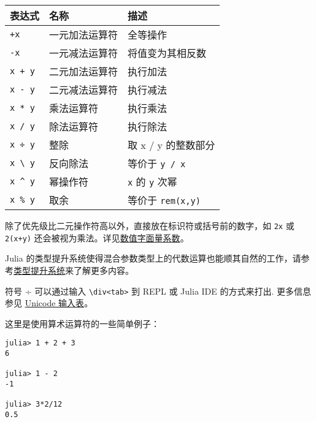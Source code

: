 \begin{table}[h]

\begin{tabulary}{\linewidth}{|L|L|L|}
\hline
表达式 & 名称 & 描述 \\
\hline
\texttt{+x} & 一元加法运算符 & 全等操作 \\
\hline
\texttt{-x} & 一元减法运算符 & 将值变为其相反数 \\
\hline
\texttt{x + y} & 二元加法运算符 & 执行加法 \\
\hline
\texttt{x - y} & 二元减法运算符 & 执行减法 \\
\hline
\texttt{x * y} & 乘法运算符 & 执行乘法 \\
\hline
\texttt{x / y} & 除法运算符 & 执行除法 \\
\hline
\texttt{x ÷ y} & 整除 & 取 x / y 的整数部分 \\
\hline
\texttt{x {\textbackslash} y} & 反向除法 & 等价于 \texttt{y / x} \\
\hline
\texttt{x {\textasciicircum} y} & 幂操作符 & \texttt{x} 的 \texttt{y} 次幂 \\
\hline
\texttt{x \% y} & 取余 & 等价于 \texttt{rem(x,y)} \\
\hline
\end{tabulary}

\end{table}



除了优先级比二元操作符高以外，直接放在标识符或括号前的数字，如 \texttt{2x} 或 \texttt{2(x+y)} 还会被视为乘法。详见\hyperlink{7285052708387693199}{数值字面量系数}。



Julia 的类型提升系统使得混合参数类型上的代数运算也能顺其自然的工作，请参考\hyperlink{10374023657104680331}{类型提升系统}来了解更多内容。



符号 ÷ 可以通过输入 \texttt{{\textbackslash}div<tab>}  到 REPL 或 Julia IDE 的方式来打出. 更多信息参见 \hyperlink{12388770544499622804}{Unicode 输入表}。



这里是使用算术运算符的一些简单例子：




\begin{verbatim}
julia> 1 + 2 + 3
6

julia> 1 - 2
-1

julia> 3*2/12
0.5
\end{verbatim}



